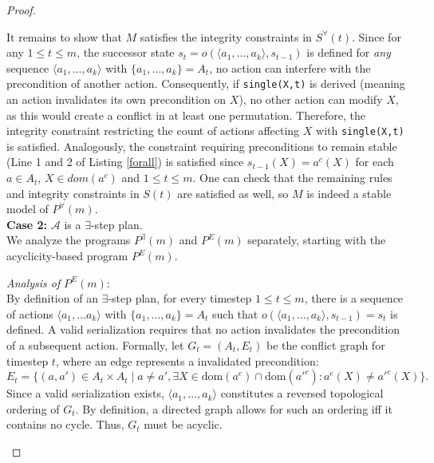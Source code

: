 \documentclass[
     11pt,                    %
     a4paper,             %
     BCOR=10mm,     %
     DIV=14,                 %
     listof=totoc,                    %
     bibliography=totoc,       %
     index=totoc,              %
     parskip            %
     twoside,
     headsepline
     ]{scrreprt}
\theoremstyle{definition}
\theoremstyle{definition}
\theoremstyle{remark}
\theoremstyle{bfnote}
\newcommand{\dom}{\mathrm{dom}}
\begin{document}
\begin{proof}
\begin{itemize}
      It remains to show that $M$ satisfies the integrity constraints in $S^\forall(t)$.
      Since for any $1 \le t \le m$, the successor state $s_t= o(\langle a_1, \dots, a_k \rangle, s_{t-1})$ is defined for \textit{any} sequence $\langle a_1, \dots, a_k \rangle$ with $\{a_1, \dots, a_k\} = A_t$, no action can interfere with the precondition of another action.
      Consequently, if \texttt{single(X,t)} is derived (meaning an action invalidates its own precondition on $X$), no other action can modify $X$, as this would create a conflict in at least one permutation. Therefore, the integrity constraint restricting the count of actions affecting $X$ with \texttt{single(X,t)} is satisfied.
      Analogously, the constraint requiring preconditions to remain stable (Line 1 and 2 of Listing \ref{forall}) is satisfied since $s_{t-1}(X)=a^c(X)$ for each $a \in A_t$, $X \in dom(a^c)$ and $1\le t \le m$.
      One can check that the remaining rules and integrity constraints in $S(t)$ are satisfied as well, so $M$ is indeed a stable model of $P^\forall(m)$. \\

      \textbf{Case 2:} $\mathcal A$ is a $\exists$-step plan. \\
      We analyze the programs $P^\exists(m)$ and $P^E(m)$ separately, starting with the acyclicity-based program $P^E(m)$. \vspace{0.5em}

      \textit{Analysis of }$P^E(m)$: \\
      By definition of an $\exists$-step plan, for every timestep $1 \le t \le m$, there is a sequence of actions $\langle a_1, \dots a_k\rangle$ with $\{a_1, \dots, a_k\} = A_t$ such that $o(\langle a_1, \dots, a_k \rangle, s_{t-1}) = s_t$ is defined. A valid serialization requires that no action invalidates the precondition of a subsequent action.
      Formally, let $G_t = (A_t, E_t)$ be the conflict graph for timestep $t$, where an edge represents a invalidated precondition:
      \[
        E_t = \{ (a, a') \in A_t \times A_t \mid a \ne a', \exists X \in \dom(a^e) \cap \dom(a'^c) : a^e(X) \ne a'^c(X) \}.
      \]
      Since a valid serialization exists, $\langle a_1, \dots, a_k \rangle$ constitutes a reversed topological ordering of $G_t$. By definition, a directed graph allows for such an ordering iff it contains no cycle. Thus, $G_t$ must be acyclic.


\end{itemize}
\end{proof}
\end{document}
